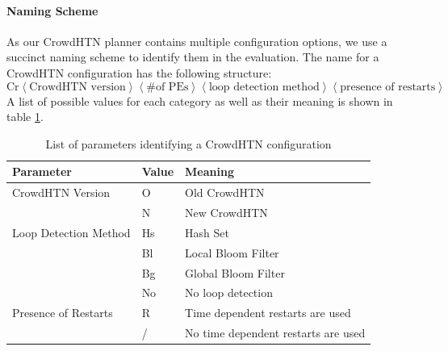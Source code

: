 \paragraph{Naming Scheme}
As our CrowdHTN planner contains multiple configuration options, we use a succinct naming scheme to identify them in the evaluation. The name for a CrowdHTN configuration has the following structure:
\[
	\text{Cr}
	\left\langle \text{CrowdHTN version} \right\rangle
	\left\langle \# \text{of PEs} \right\rangle
	\left\langle \text{loop detection method} \right\rangle
	\left\langle \text{presence of restarts} \right\rangle
\]
A list of possible values for each category as well as their meaning is shown in table \ref{table: crowd configs}.
\begin{table}
	\caption{List of parameters identifying a CrowdHTN configuration}
	\label{table: crowd configs}
	\centering
	\begin{tabular}{|l|l|l|}
		\hline
		Parameter & Value & Meaning \\
		\hline
		CrowdHTN Version & O & Old CrowdHTN \\
		 			     & N & New CrowdHTN \\
		\hline
		Loop Detection Method & Hs & Hash Set \\
							  & Bl & Local Bloom Filter \\
							  & Bg & Global Bloom Filter \\
							  & No & No loop detection \\
		\hline
		Presence of Restarts & R & Time dependent restarts are used \\
							 & / & No time dependent restarts are used \\
		\hline
	\end{tabular}
\end{table}

